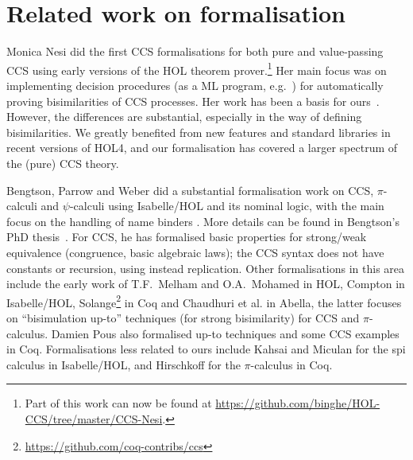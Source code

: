 \section{Related work on formalisation}
\label{s:rel}

Monica Nesi did the first CCS formalisations for both pure and
value-passing CCS \cite{Nesi:1992ve,Nesi:2017wo} using early versions of the HOL
theorem prover.\footnote{Part of this work can now be found at
  \url{https://github.com/binghe/HOL-CCS/tree/master/CCS-Nesi}.}
Her main focus was on implementing decision procedures (as a ML
program, e.g.~\cite{cleaveland1993concurrency}) for
automatically proving bisimilarities of CCS processes.
Her work has been a basis for ours~\cite{Tian:2017wrba}.
However, the differences are substantial, especially in the way of defining
bisimilarities. We greatly benefited from new features and standard
libraries in recent versions of HOL4, and our formalisation has
covered a  larger spectrum of the (pure) CCS theory.

Bengtson, Parrow and Weber did a substantial formalisation work
on CCS, $\pi$-calculi
and $\psi$-calculi 
using Isabelle/HOL and its nominal logic, with the main focus on the handling of
name binders \cite{bengtson2007completeness,parrow2009formalising}.
More details can be found in Bengtson's PhD thesis~\cite{bengtson2010formalising}. For CCS, 
he has formalised basic properties for strong/weak equivalence (congruence, basic %
 algebraic laws); the CCS syntax does not have constants
or recursion, using instead replication.
%
Other formalisations in this area include the early work of T.F.~Melham
\cite{melham1994mechanized} and O.A.~Mohamed
\cite{mohamed1995mechanizing} in HOL, Compton
\cite{compton2005embedding} in Isabelle/HOL,
Solange\footnote{\url{https://github.com/coq-contribs/ccs}} in Coq
and Chaudhuri et al.\;\cite{chaudhuri2015lightweight} in Abella, the latter
focuses on ``bisimulation up-to'' techniques (for strong bisimilarity)
for CCS and $\pi$-calculus.
Damien Pous \cite{pous2007new} also formalised up-to techniques and some CCS examples in
Coq.
Formalisations less related to ours
include Kahsai and Miculan \cite{kahsai2008implementing} for the spi
calculus in Isabelle/HOL, and Hirschkoff \cite{hirschkoff1997full} for the $\pi$-calculus in Coq.

